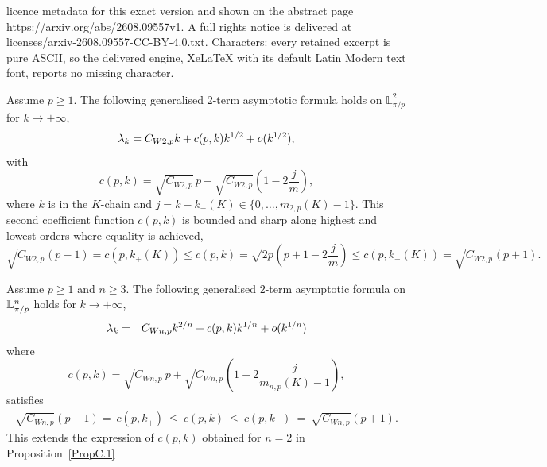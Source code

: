 \documentclass[10pt,a4paper]{amsart}
\newcommand{\Cwnp}[2]{ C_{W #1,#2}}
\newcommand{\luned}[2]{\raisebox{0.5pt}{${}$}\mathbb{L}^{#1}_{\pi/#2}}
\newcommand{\lune}[2]{\mathbb{L}^{#1}_{#2}}
\newcommand{\so}{{\rm o}}
\begin{document}
licence metadata for this exact version and shown on the abstract page https://arxiv.org/abs/2608.09557v1. A full rights notice is delivered at licenses/arxiv-2608.09557-CC-BY-4.0.txt. Characters: every retained excerpt is pure ASCII, so the delivered engine, XeLaTeX with its default Latin Modern text font, reports no missing character.
 \begin{proposition} \label{PropC.1}
 Assume {$p\geq 1$}. The following generalised 2-term asymptotic formula holds on $\lune{2}{\pi/p}$ for $k\to +\infty$,
 \begin{equation}\label{Gen2term}
 \lambda_k=\Cwnp{2}{p} k + c(p,k)k^{1/2} +\so(k^{1/2}),
 \end{equation}
 with 
 \[c(p,k)= \sqrt{\Cwnp{2}{p}}\, p+\sqrt{\Cwnp{2}{p}}\left(1-2\frac{j}{m}\right),\]
 where $k$ is in the $K$-chain and
$j=k-k_-(K)\in \{0, \ldots, m_{2,p}(K)-1\}$. This
 second coefficient function $c(p,k)$ is bounded and  sharp along highest and lowest orders where equality is achieved, 
 \[\sqrt{\Cwnp{2}{p}}(p-1) = c(p,k_+(K))\leq c(p,k)= \sqrt{2p}\left(p+1-2\frac{j}{m}\right)\leq c(p,k_-(K))=\sqrt{\Cwnp{2}{p}}(p+1).\]
\end{proposition}

\begin{proposition} \label{PropC3} Assume $p\geq 1$ and $n\geq 3$.
The following generalised $2$-term asymptotic formula on $\luned{n}{p}$ holds for $k\to +\infty$,
\begin{eqnarray}\label{o-3term}
 \lambda_k &=&\Cwnp{n}{p}k^{2/n}+  c(p,k)k^{1/n} +\so(k^{1/n})
\end{eqnarray}
 where
 \[c(p,k)=\sqrt{\Cwnp{n}{p}}\, p+ \sqrt{\Cwnp{n}{p}}\left( 1-2\frac{j}{m_{n,p}(K)-1}\right),\]
satisfies
\begin{gather*}
\sqrt{\Cwnp{n}{p}}(p-1)=~c(p,k_+)~\leq ~ c(p,k)~\leq ~  c(p,k_-)~=~\sqrt{\Cwnp{n}{p}}(p+1).
\end{gather*}
This extends the expression of $c(p,k)$ obtained for $n=2$ in Proposition~\ref{PropC.1}
 \end{proposition}
\end{document}
